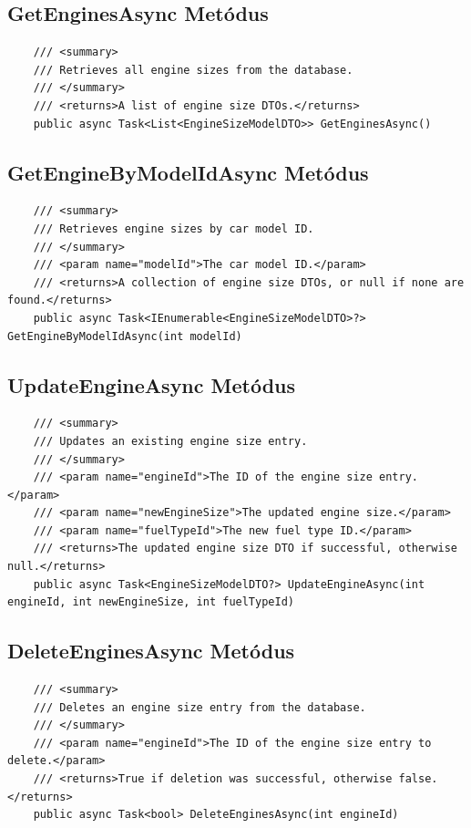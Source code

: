 \documentclass{report}[11pt]
\begin{document}
\subsection*{GetEnginesAsync Metódus}
\begin{lstlisting}
    /// <summary>
    /// Retrieves all engine sizes from the database.
    /// </summary>
    /// <returns>A list of engine size DTOs.</returns>
    public async Task<List<EngineSizeModelDTO>> GetEnginesAsync()
\end{lstlisting}

\subsection*{GetEngineByModelIdAsync Metódus}
\begin{lstlisting}
    /// <summary>
    /// Retrieves engine sizes by car model ID.
    /// </summary>
    /// <param name="modelId">The car model ID.</param>
    /// <returns>A collection of engine size DTOs, or null if none are found.</returns>
    public async Task<IEnumerable<EngineSizeModelDTO>?> GetEngineByModelIdAsync(int modelId)
\end{lstlisting}

\subsection*{UpdateEngineAsync Metódus}
\begin{lstlisting}
    /// <summary>
    /// Updates an existing engine size entry.
    /// </summary>
    /// <param name="engineId">The ID of the engine size entry.</param>
    /// <param name="newEngineSize">The updated engine size.</param>
    /// <param name="fuelTypeId">The new fuel type ID.</param>
    /// <returns>The updated engine size DTO if successful, otherwise null.</returns>
    public async Task<EngineSizeModelDTO?> UpdateEngineAsync(int engineId, int newEngineSize, int fuelTypeId)
\end{lstlisting}

\subsection*{DeleteEnginesAsync Metódus}
\begin{lstlisting}
    /// <summary>
    /// Deletes an engine size entry from the database.
    /// </summary>
    /// <param name="engineId">The ID of the engine size entry to delete.</param>
    /// <returns>True if deletion was successful, otherwise false.</returns>
    public async Task<bool> DeleteEnginesAsync(int engineId)
\end{lstlisting}
\end{document}
